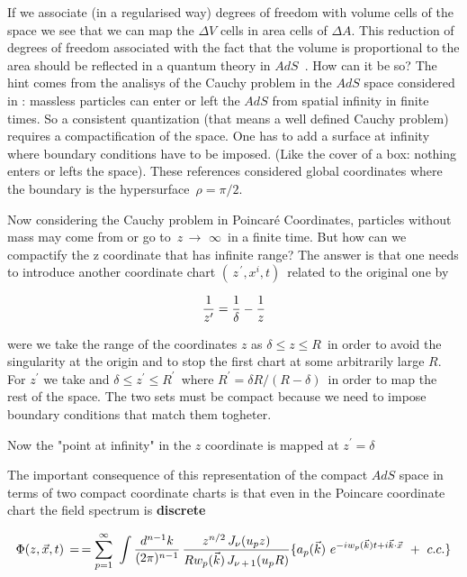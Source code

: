 \documentclass[a4paper,twocolumn,prd,groupedaddress,nofootinbib]{revtex4}
\begin{document}
\noindent If we associate (in a regularised way) degrees of freedom  with volume cells 
of the space we see that we can map the $\Delta V$ cells in  area cells
of $\Delta A$.
This reduction of degrees of freedom 
associated with the fact that the volume is proportional to the
area should be reflected in a quantum theory in $AdS$ $\,$.
How can it be so?
The hint comes from the analisys of the Cauchy problem in the $AdS$ space
considered in \cite{QAdS1,QAdS2}: 
massless particles can enter or left the $AdS$ from spatial infinity in finite times.
So a consistent quantization (that means a well defined Cauchy problem) requires 
a compactification of the space. 
One has to add a surface at infinity where boundary conditions have to be imposed.
(Like the cover of a box: nothing enters or lefts the space).
These references considered global coordinates where 
the boundary is the hypersurface $\,\rho = \pi/2$.
 
Now considering the Cauchy problem in Poincar\'e Coordinates, particles without mass 
may come from or go to $\,z\, \rightarrow\,\,\infty \,$ in a finite time.
But how can we compactify the z coordinate that has infinite range?
The answer \cite{BB1,BB2,BB3} is that one needs to introduce another coordinate chart
$(\,z^{\,\prime} , x^i , t ) \,$ related to the original one by

\begin{eqnarray}
{1\over z^\prime} = {1\over \delta} - {1\over z} 
\end{eqnarray}

\noindent were we take the range of the coordinates $z$ as $\delta \le z \le R \,$ 
in order to avoid  the singularity at the origin and to stop the first chart at 
some arbitrarily large $R$. For $z^\prime $ we take  and 
$\delta \le z^\prime \le R^\prime \,$   where $R^\prime= \delta R /( R - \delta )\,$ 
in order to map the rest of the space. The two sets must be compact because we need to 
impose boundary conditions that match them togheter.

Now the "point at infinity" in the $z$ coordinate is mapped at $z^\prime = \delta$

\bigskip
 \noindent 
The important consequence of this representation of the compact $AdS$ space in 
terms of two compact coordinate charts is that even in the Poincare coordinate chart
the field spectrum is {\bf discrete}

\begin{widetext}

\begin{equation}
\label{QF}
\Phi(z,\vec x,t)\,=\, 
 = \sum_{p=1}^\infty \,\, \int {d^{n-1}k \over (2\pi)^{n-1}}\,
{z^{n/2} \,J_\nu (u_p z ) \over R w_p(\vec k ) 
\,J_{\nu\,+\,1} (u_p R ) }
\lbrace { a_p(\vec k )\ }
 e^{-iw_p(\vec k ) t +i\vec k \cdot \vec x}\,
\,+\,\,c.c.\rbrace
\end{equation}

\end{widetext}
 
\end{document}

